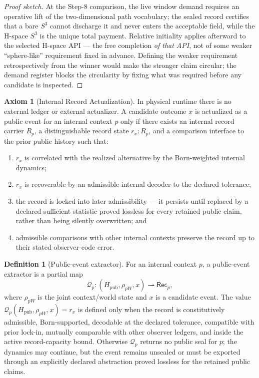 \documentclass[11pt]{article}
\theoremstyle{plain}
\theoremstyle{definition}
\newtheorem{definition}[theorem]{Definition}
\newtheorem{axiom}[theorem]{Axiom}
\theoremstyle{remark}
\newenvironment{proofsketch}{\begin{proof}[Proof sketch]}{\end{proof}}
\begin{document}
\begin{proofsketch}
At the Step-8 comparison, the live window demand requires an operative lift of the two-dimensional path vocabulary; the sealed record certifies that a bare \(S^3\) cannot discharge it and never enters the acceptable field, while the H-space \(S^3\) is the unique total payment. Relative initiality applies afterward to the selected H-space API --- the free completion \emph{of that API}, not of some weaker ``sphere-like'' requirement fixed in advance. Defining the weaker requirement retrospectively from the winner would make the stronger claim circular; the demand register blocks the circularity by fixing what was required before any candidate is inspected.
\end{proofsketch}

\begin{axiom}[Internal Record Actualization]
In physical runtime there is no external ledger or external actualizer. A candidate outcome \(x\) is actualized as a public event for an internal context \(p\) only if there exists an internal record carrier \(R_p\), a distinguishable record state \(r_x:R_p\), and a comparison interface to the prior public history such that:
\begin{enumerate}[leftmargin=*]
\item \(r_x\) is correlated with the realized alternative by the Born-weighted internal dynamics;
\item \(r_x\) is recoverable by an admissible internal decoder to the declared tolerance;
\item the record is locked into later admissibility --- it persists until replaced by a declared sufficient statistic proved lossless for every retained public claim, rather than being silently overwritten; and
\item admissible comparisons with other internal contexts preserve the record up to their stated observer-code error.
\end{enumerate}
\end{axiom}

\begin{definition}[Public-event extractor]
For an internal context \(p\), a public-event extractor is a partial map
\[
\mathcal{Q}_p:
(H_{\mathrm{pub}},\rho_{pW},x)
\rightharpoonup
\mathsf{Rec}_p,
\]
where \(\rho_{pW}\) is the joint context/world state and \(x\) is a candidate event. The value \(\mathcal{Q}_p(H_{\mathrm{pub}},\rho_{pW},x)=r_x\) is defined only when the record is constitutively admissible, Born-supported, decodable at the declared tolerance, compatible with prior lock-in, mutually comparable with other observer ledgers, and inside the active record-capacity bound. Otherwise \(\mathcal{Q}_p\) returns no public seal for \(p\); the dynamics may continue, but the event remains unsealed or must be exported through an explicitly declared abstraction proved lossless for the retained public claims.
\end{definition}
\end{document}
